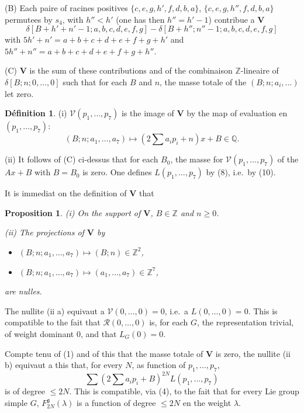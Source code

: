 \documentclass[11pt,a4paper]{article}
\theoremstyle{plain}
\newtheorem{proposition}[theorem]{Proposition}
\theoremstyle{definition}
\newtheorem{definition}[theorem]{D\'efinition}
\begin{document}
\smallskip

(B) Each paire of racines positives $\{c, e, g, h', f, d, b, a\}$, $\{c, e, g, h'', f, d, b, a\}$ permutees by $s_4$, with $h'' < h'$ (one has then $h'' = h' - 1$) contribue a $\mathbf{V}$
\[
\delta[B+h'+n'-1; a,b,c,d,e,f,g] - \delta[B+h''; n''-1; a,b,c,d,e,f,g]
\]
with $5h' + n' = a + b + c + d + e + f + g + h'$ and $5h'' + n'' = a + b + c + d + e + f + g + h''$.

\smallskip

(C) $\mathbf{V}$ is the sum of these contributions and of the combinaison $\mathbb{Z}$-lineaire of $\delta[B; n; 0,\dots,0]$ such that for each $B$ and $n$, the masse totale of the $(B; n; a_i,\dots)$ let zero.

\begin{definition}
(i) $\mathcal{V}(p_1,\dots,p_7)$ is the image of $\mathbf{V}$ by the map of evaluation en $(p_1,\dots,p_7)$:
\[
(B; n; a_1,\dots,a_7) \mapsto (2\textstyle\sum a_i p_i + n)x + B \in \mathbb{Q}.
\]

(ii) It follows of (C) ci-dessus that for each $B_0$, the masse for $\mathcal{V}(p_1,\dots,p_7)$ of the $Ax + B$ with $B = B_0$ is zero. One defines $L(p_1,\dots,p_7)$ by (8), i.e.\ by (10).
\end{definition}

It is immediat on the definition of $\mathbf{V}$ that

\begin{proposition}\label{prop:1}
\textup{(i)} On the support of $\mathbf{V}$, $B \in \mathbb{Z}$ and $n \geq 0$.

\textup{(ii)} The projections of $\mathbf{V}$ by
\begin{itemize}
\item[(a)] $(B; n; a_1,\dots,a_7) \mapsto (B; n) \in \mathbb{Z}^2$,
\item[(b)] $(B; n; a_1,\dots,a_7) \mapsto (a_1,\dots,a_7) \in \mathbb{Z}^7$,
\end{itemize}
are nulles.
\end{proposition}

The nullite (ii a) equivaut a $\mathcal{V}(0,\dots,0) = 0$, i.e.\ a $L(0,\dots,0) = 0$. This is compatible to the fait that $\mathcal{R}(0,\dots,0)$ is, for each $G$, the representation trivial, of weight dominant $0$, and that $L_G(0) = 0$.

Compte tenu of (1) and of this that the masse totale of $\mathbf{V}$ is zero, the nullite (ii b) equivaut a this that, for every $N$, as function of $p_1,\dots,p_7$,
\[
\sum (2\textstyle\sum a_i p_i + B)^{2N} L(p_1,\dots,p_7)
\]
is of degree $\leq 2N$. This is compatible, via (4), to the fait that for every Lie group simple $G$, $F_{2N}^{\mathfrak{g}}(\lambda)$ is a function of degree $\leq 2N$ en the weight $\lambda$.
\end{document}
